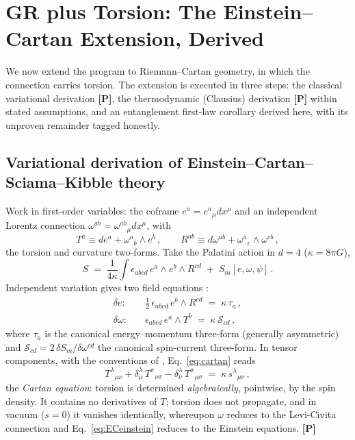 \documentclass[11pt]{article}
\theoremstyle{definition}
\newcommand{\pP}{\textbf{[P]}}
\begin{document}
\section{GR plus Torsion: The Einstein--Cartan Extension, Derived}
\label{sec:torsion}

We now extend the program to Riemann--Cartan geometry, in which the
connection carries torsion. The extension is executed in three steps: the
classical variational derivation \pP{}, the thermodynamic (Clausius)
derivation \pP{} within stated assumptions, and an entanglement first-law
corollary derived here, with its unproven remainder tagged honestly.

\subsection{Variational derivation of Einstein--Cartan--Sciama--Kibble
theory}

Work in first-order variables: the coframe $e^a=e^a{}_\mu dx^\mu$ and an
independent Lorentz connection $\omega^{ab}=\omega^{ab}{}_\mu dx^\mu$, with
\begin{equation}
T^a \equiv de^a+\omega^a{}_b\wedge e^b\,,\qquad
R^{ab}\equiv d\omega^{ab}+\omega^a{}_c\wedge\omega^{cb}\,,
\end{equation}
the torsion and curvature two-forms. Take the Palatini action in $d=4$
($\kappa=8\pi G$),
\begin{equation}
S \;=\; \frac{1}{4\kappa}\int \epsilon_{abcd}\,e^a\wedge e^b\wedge R^{cd}
\;+\; S_m[e,\omega,\psi]\,.
\label{eq:ECaction}
\end{equation}
Independent variation gives two field equations \cite{Kibble1961,Sciama1964,
HehlRMP1976,Trautman2006}:
\begin{align}
\delta e:&\quad
\tfrac{1}{2}\,\epsilon_{abcd}\,e^b\wedge R^{cd} \;=\; \kappa\,\tau_a\,,
\label{eq:ECeinstein}\\[2pt]
\delta\omega:&\quad
\epsilon_{abcd}\,e^a\wedge T^b \;=\; \kappa\,\mathcal{S}_{cd}\,,
\label{eq:cartan}
\end{align}
where $\tau_a$ is the canonical energy--momentum three-form (generally
asymmetric) and $\mathcal{S}_{cd}=2\,\delta S_m/\delta\omega^{cd}$ the
canonical spin-current three-form. In tensor components, with the
conventions of \cite{HehlRMP1976}, Eq.~\eqref{eq:cartan} reads
\begin{equation}
T^\lambda{}_{\mu\nu}
+\delta^\lambda_\mu\,T^\sigma{}_{\nu\sigma}
-\delta^\lambda_\nu\,T^\sigma{}_{\mu\sigma}
\;=\;\kappa\, s^\lambda{}_{\mu\nu}\,,
\label{eq:cartantensor}
\end{equation}
the \emph{Cartan equation}: torsion is determined \emph{algebraically},
pointwise, by the spin density. It contains no derivatives of $T$; torsion
does not propagate, and in vacuum ($s=0$) it vanishes identically, whereupon
$\omega$ reduces to the Levi-Civita connection and
Eq.~\eqref{eq:ECeinstein} reduces to the Einstein equations. \pP{}
\end{document}
